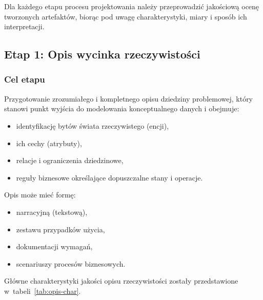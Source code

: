 Dla każdego etapu procesu projektowania należy przeprowadzić jakościową ocenę tworzonych artefaktów, biorąc pod uwagę charakterystyki, miary i sposób ich interpretacji.

\subsection*{Etap 1: Opis wycinka rzeczywistości}

\subsubsection*{Cel etapu}

Przygotowanie zrozumiałego i kompletnego opisu dziedziny problemowej, który stanowi punkt wyjścia do modelowania konceptualnego danych i obejmuje:
\begin{itemize}
  \item identyfikację bytów świata rzeczywistego (encji),
  \item ich cechy (atrybuty),
  \item relacje i ograniczenia dziedzinowe,
  \item reguły biznesowe określające dopuszczalne stany i operacje.
\end{itemize}

Opis może mieć formę:
\begin{itemize}
  \item narracyjną (tekstową),
  \item zestawu przypadków użycia,
  \item dokumentacji wymagań,
  \item scenariuszy procesów biznesowych.
\end{itemize}

Główne charakterystyki jakości opisu rzeczywistości zostały przedstawione w~tabeli~\ref{tab:opis-char}.

